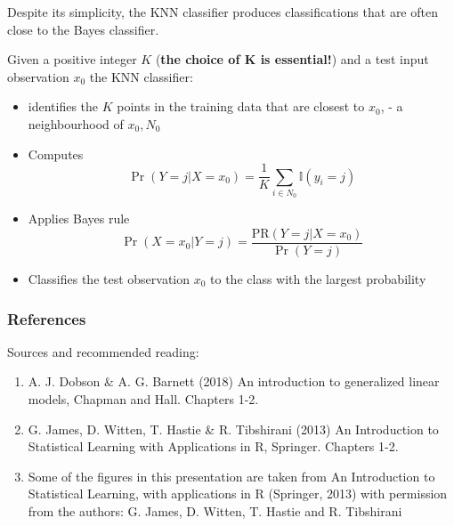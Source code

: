 \documentclass[11pt]{article}
\begin{document}
Despite its simplicity, the KNN classifier produces classifications that are often close to the Bayes classifier.

Given a positive integer $K$ (\textbf{the choice of K is essential!}) and a test input observation $x_0$ the KNN classifier:
\begin{itemize}
    \item identifies the $K$ points in the training data that are closest to $x_0$, - a neighbourhood of $x_0, N_0$
    \item Computes
    \[\Pr(Y = j | X = x_0) = \dfrac{1}{K} \sum_{i \in N_0} \mathbb{I}(y_i = j)\]
    \item Applies Bayes rule
    \[\Pr(X = x_0 | Y = j) = \dfrac{\text{PR}(Y = j|X = x_0)}{\Pr(Y=j)}\]
    \item Classifies the test observation $x_0$ to the class with the largest probability
\end{itemize}

\subsubsection{References}
Sources and recommended reading:

\begin{enumerate}
    \item A. J. Dobson \& A. G. Barnett (2018) An introduction to generalized linear models, Chapman and Hall. Chapters 1-2.
    \item G. James, D. Witten, T. Hastie \& R. Tibshirani (2013) An Introduction to Statistical Learning with Applications in R, Springer. Chapters 1-2.
    \item Some of the figures in this presentation are taken from An Introduction to Statistical Learning, with applications in R (Springer, 2013) with permission from the authors: G. James, D. Witten, T. Hastie and R. Tibshirani
\end{enumerate}
\end{document}
